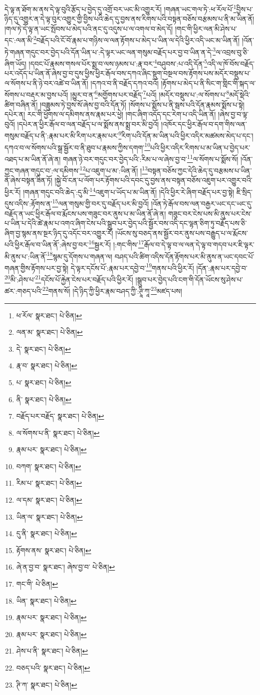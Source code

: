 དེ་ལྟ་ན་ཐོག་མ་ནས་དེ་ལྟ་བུའི་རྩོད་པ་བྱེད་དུ་འགྲོ་བར་ཡང་མི་འགྱུར་རོ། །གཞན་ཡང་གལ་ཏེ་:ཕ་རོལ་པོ་\footnote{ཕ་རོལ་  སྣར་ཐང་།  པེ་ཅིན། }བྱིས་པ་ཉིད་དུ་འགྱུར་ན་དེ་ལྟ་བུར་འགྱུར་གྱི་བྱིས་པའི་ཆེད་དུ་བྱས་ནས་རིགས་པའི་བསྟན་བཅོས་བརྩམས་པ་ནི་མ་ཡིན་ནོ། །གལ་ཏེ་དེ་ལྟ་ན་ཡང་སྤོབས་པ་མེད་པའི་ནང་དུ་འདུས་པ་ལ་འགལ་བ་མེད་དོ། །གང་གི་ཕྱིར་ལན་མི་ཤེས་པ་དང་:ལན་མི་\footnote{ལན་མ་  སྣར་ཐང་།  པེ་ཅིན། }བརྗོད་པའི་ངོ་བོ་རྣམ་པ་གཉིས་ལ་ལན་རྟོགས་པ་མེད་པ་ཡིན་ལ་དེའི་ཕྱིར་འདི་ཡང་མ་ཡིན་ནོ། །འོན་ཏེ་གཞན་གདུང་བར་བྱེད་པའི་དོན་ཡིན་པ་:དེ་ལྟར་ཡང་ལན་གསུམ་བརྗོད་པར་བྱ་བ་ཡིན་ན་དེ་\footnote{དེ་  སྣར་ཐང་།  པེ་ཅིན། }ལ་འབྲས་བུ་ཅི་ཞིག་ཡོད། །དབང་པོ་རྣམས་གསལ་པོར་སྨྲ་བ་ལས་ཉམས་པ་:རྣ་བར་\footnote{རྣ་བ་  སྣར་ཐང་།  པེ་ཅིན། }བཤུབས་:པ་འདི་དོན་\footnote{པ་  སྣར་ཐང་།  པེ་ཅིན། }འདི་ལ་ཁོ་བོས་བརྗོད་པར་འདོད་པ་ཡིན་ནོ་ཞེས་བྱ་བ་དུས་ཕྱིས་ཕྱིར་རྒོལ་བས་དཀའ་ཞིང་སྡུག་བསྔལ་བས་རྟོགས་པས་མདོར་བསྡུས་པ་ལ་སོགས་པ་ནི་ཉེ་བར་འཚེ་བ་ཡིན་ནོ། །དཀའ་བ་ནི་བརྗོད་དཀའ་བའོ། །རྟོགས་པ་མེད་པ་ནི་སིང་ག་གླིང་གི་སྐད་ལ་སོགས་པ་བརྡར་མ་བྱས་པའོ། །མྱུར་བ་ན་\footnote{ནི་  སྣར་ཐང་།  པེ་ཅིན། }མགྱོགས་པར་བརྗོད་\footnote{བརྗོད་པར་བརྗོད་  སྣར་ཐང་།  པེ་ཅིན། }པའོ། །མདོར་བསྡུས་པ་:ལ་སོགས་པ་\footnote{ལ་སོགས་པ་ནི་  སྣར་ཐང་།  པེ་ཅིན། }མདོ་སྡེའི་ཚིག་བཞིན་ནོ། །བཟླུམས་ཏེ་བྱས་སོ་ཞེས་བྱ་བའི་དོན་ཏོ། །སོགས་པ་སྨོས་པ་ནི་སྦས་པའི་དོན་རྣམས་སྨོས་པ་སྟེ། དཔེར་ན། རང་གི་ཕྱོགས་ལ་དམིགས་ནས་རྣམ་པར་ཕྱེ། །གང་ཞིག་འདོད་དང་རེག་པ་འདི་ཡིན་ནོ། །ཞེས་བྱ་བ་ལྟ་བུའོ། །དཔེར་ན་ཕྱིར་རྒོལ་བ་ལན་བརྗོད་པ་ལ་སྨོས་ནས་སྨྲ་བར་མི་བྱའོ། །འཁོར་དང་ཕྱིར་རྒོལ་བ་དག་གིས་ལན་གསུམ་བརྗོད་པ་ནི་:རྣམ་པར་མི་རིག་པར་རྣམ་པར་\footnote{རྣམ་པར་  སྣར་ཐང་།  པེ་ཅིན། }རིག་པའི་དོན་མ་ཡིན་པའི་ཕྱིར་འདིར་མཚམས་མེད་པ་དང་། དཀའ་བ་ལ་སོགས་པའི་སྒྲ་སྦྱོར་བ་ནི་ཐུབ་པ་རྣམས་ཀྱིས་དགག་\footnote{བཀག་  སྣར་ཐང་།  པེ་ཅིན། }པའི་ཕྱིར་འདིར་རིགས་པ་མ་ཡིན་པ་བྱེད་པར་འཐད་པ་མ་ཡིན་ནོ་ཞེ་ན། གཞན་ཉེ་བར་གདུང་བར་བྱེད་པའི་:རིམ་པ་ལ་ཞེས་བྱ་བ་\footnote{རིམ་པ་  སྣར་ཐང་།  པེ་ཅིན། }ལ་སོགས་པ་སྨོས་སོ། །འོན་ཀྱང་གཞན་གདུང་བ་:ལ་དམིགས་\footnote{ལ་དམ་  སྣར་ཐང་།  པེ་ཅིན། }པ་འཇུག་པ་མ་:ཡིན་ནོ། །\footnote{ཡིན་ལ་  སྣར་ཐང་།  པེ་ཅིན། }བསྟན་བཅོས་ཀྱང་དེའི་ཆེད་དུ་བརྩམས་པ་ཡིན་ནོ་ཞེས་བསྟན་ཟིན་ཏོ། །སྐྱེ་བོ་ངན་པ་ལོག་པར་རྟོགས་པའི་དབང་དུ་བྱས་ནས་བསྟན་བཅོས་འཇུག་པར་འགྱུར་བའི་ཕྱིར་རོ། །གཞན་གདུང་བའི་ཆེད་:དུ་མི་\footnote{དུ་ནི་  སྣར་ཐང་།  པེ་ཅིན། }འཇུག་པ་ཡོད་པ་མ་ཡིན་ནོ། །དེའི་ཕྱིར་རེ་ཞིག་བརྗོད་པར་བྱ་སྟེ། ཇི་སྲིད་དུས་འདིས་:རྟོགས་ན་\footnote{རྟོགས་ནས་  སྣར་ཐང་།  པེ་ཅིན། }ལན་གསུམ་གྱི་བར་དུ་བརྗོད་པར་མི་བྱའོ། །འོན་ཏེ་རྒོལ་བས་ལན་བརྒྱར་ཡང་དང་ཡང་དུ་བརྗོད་ན་ཡང་ཕྱིར་རྒོལ་བ་རྨོངས་པས་གཟུང་བར་ནུས་པ་མ་ཡིན་ནོ་ཞེ་ན། གཟུང་བར་ངེས་པས་མི་ནུས་པར་ངེས་པ་ཡིན་པ་དེའི་ཚེ་རྣམ་པ་འགའ་ཞིག་ངེས་པའི་སྒྲུབ་པར་བྱེད་པའི་སྦྱོར་བས་འདི་དང་ལྷན་ཅིག་ཏུ་བརྗོད་པས་ཅི་ཞིག་བྱ་སྙམ་ནས་སྔར་ཉིད་དུ་འདོང་བར་འགྱུར་རོ། །ཡོངས་སུ་བཅད་ནས་སྦྱོར་བར་ནུས་པས་བརྒྱུད་པ་ལ་རྨོངས་པའི་ཕྱིར་རྒོལ་བ་ཡིན་ནོ་:ཞེས་བྱ་བར་\footnote{ཞེ་ན་བྱ་བ་  སྣར་ཐང་། ཞེས་བྱ་བ་  པེ་ཅིན། }སྦྱར་རོ། །:གང་གིས་\footnote{གང་གི་  པེ་ཅིན། }རྒོལ་བ་དེ་ལྟ་བ་ལ་ལན་དེ་ལྟ་བ་གདབ་པར་ཇི་ལྟར་མི་ནུས་པ་:ཡིན་ནོ་\footnote{ཡིན་  སྣར་ཐང་།  པེ་ཅིན། }སྙམ་དུ་དོགས་པ་གཞན་ལ། བཤད་པའི་ཚིག་འདིས་དོན་རྟོགས་པར་མི་ནུས་ན་ཡང་དབང་པོ་གཞན་གྱིས་རྟོགས་པར་བྱ་སྟེ། དེ་ལྟར་དངོས་པོ་:རྣམ་པར་དབྱེ་བ་\footnote{རྣམ་པར་  སྣར་ཐང་།  པེ་ཅིན། }གནས་པའི་ཕྱིར་རོ། །དོན་:རྣམ་པར་དབྱེ་བ་\footnote{རྣམ་པར་  སྣར་ཐང་།  པེ་ཅིན། }མི་:ཤེས་པ་\footnote{ཤེས་པ་ནི་  སྣར་ཐང་།  པེ་ཅིན། }དངོས་པོ་རྐྱེན་ངེས་པར་བརྗོད་པའི་ཕྱིར་རོ། །སྒྲུབ་པར་བྱེད་པའི་ངག་གི་དོན་ཡོངས་སུ་ཤེས་པ་ཚར་:གཅད་པའི་\footnote{བཅད་པའི་  སྣར་ཐང་།  པེ་ཅིན། }གནས་སོ། །དེ་ཉིད་ཀྱི་ཕྱིར་རྣམ་བཤད་ཀྱི་:ཊཱི་ཀཱ་\footnote{ཊི་ཀ་  སྣར་ཐང་།  པེ་ཅིན། }མཛད་པས། 